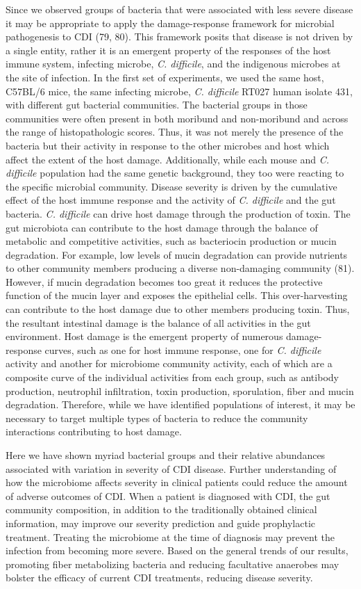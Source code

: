 \documentclass[
  12pt,
]{article}
\begin{document}
Since we observed groups of bacteria that were associated with less
severe disease it may be appropriate to apply the damage-response
framework for microbial pathogenesis to CDI (79, 80). This framework
posits that disease is not driven by a single entity, rather it is an
emergent property of the responses of the host immune system, infecting
microbe, \emph{C. difficile}, and the indigenous microbes at the site of
infection. In the first set of experiments, we used the same host,
C57BL/6 mice, the same infecting microbe, \emph{C. difficile} RT027
human isolate 431, with different gut bacterial communities. The
bacterial groups in those communities were often present in both
moribund and non-moribund and across the range of histopathologic
scores. Thus, it was not merely the presence of the bacteria but their
activity in response to the other microbes and host which affect the
extent of the host damage. Additionally, while each mouse and \emph{C.
difficile} population had the same genetic background, they too were
reacting to the specific microbial community. Disease severity is driven
by the cumulative effect of the host immune response and the activity of
\emph{C. difficile} and the gut bacteria. \emph{C. difficile} can drive
host damage through the production of toxin. The gut microbiota can
contribute to the host damage through the balance of metabolic and
competitive activities, such as bacteriocin production or mucin
degradation. For example, low levels of mucin degradation can provide
nutrients to other community members producing a diverse non-damaging
community (81). However, if mucin degradation becomes too great it
reduces the protective function of the mucin layer and exposes the
epithelial cells. This over-harvesting can contribute to the host damage
due to other members producing toxin. Thus, the resultant intestinal
damage is the balance of all activities in the gut environment. Host
damage is the emergent property of numerous damage-response curves, such
as one for host immune response, one for \emph{C. difficile} activity
and another for microbiome community activity, each of which are a
composite curve of the individual activities from each group, such as
antibody production, neutrophil infiltration, toxin production,
sporulation, fiber and mucin degradation. Therefore, while we have
identified populations of interest, it may be necessary to target
multiple types of bacteria to reduce the community interactions
contributing to host damage.

Here we have shown myriad bacterial groups and their relative abundances
associated with variation in severity of CDI disease. Further
understanding of how the microbiome affects severity in clinical
patients could reduce the amount of adverse outcomes of CDI. When a
patient is diagnosed with CDI, the gut community composition, in
addition to the traditionally obtained clinical information, may improve
our severity prediction and guide prophylactic treatment. Treating the
microbiome at the time of diagnosis may prevent the infection from
becoming more severe. Based on the general trends of our results,
promoting fiber metabolizing bacteria and reducing facultative anaerobes
may bolster the efficacy of current CDI treatments, reducing disease
severity.
\end{document}
